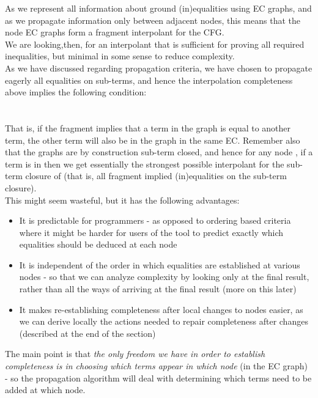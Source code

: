 As we represent all information about ground (in)equalities using EC graphs, 
and as we propagate information only between adjacent nodes, 
this means that the node EC graphs form a fragment interpolant for the CFG.\\
We are looking,then, for an interpolant that is sufficient for proving all required inequalities, but minimal in some sense to reduce complexity.\\
As we have discussed regarding propagation criteria, we have chosen to propagate eagerly all equalities on sub-terms, 
and hence the interpolation completeness above implies the following condition:\\
\\
\\
That is, if the fragment implies that a term in the graph is equal to another term, 
the other term will also be in the graph in the same EC.
Remember also that the graphs are by construction sub-term closed, and hence for any node , 
if a term  is in  then we get essentially the strongest possible interpolant for the sub-term closure of  (that is, all fragment implied (in)equalities on the sub-term closure). \\
This might seem wasteful, but it has the following advantages:
\begin{itemize}
	\item It is predictable for programmers - as opposed to ordering based criteria where it might be harder for users of the tool to predict exactly which equalities should be deduced at each node
	\item It is independent of the order in which equalities are established at various nodes - 
	so that we can analyze complexity by looking only at the final result, rather than all the ways of arriving at the final result (more on this later)
	\item It makes re-establishing completeness after local changes to nodes easier, as we can derive locally the actions needed to repair completeness after changes (described at the end of the section)
\end{itemize}
The main point is that \emph{the only freedom we have in order to establish completeness is in choosing which terms appear in which node} (in the EC graph) - so the propagation algorithm will deal with determining which terms need to be added at which node.

